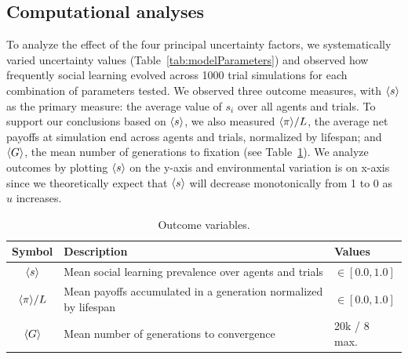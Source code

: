 \documentclass[letterpaper,11.5pt]{scrartcl}
\begin{document}
\subsection{Computational analyses}
\label{ssec:computationalAnalyses}


To analyze the effect of the four principal uncertainty factors, we systematically
varied uncertainty values (Table~\ref{tab:modelParameters}) and observed how frequently social learning evolved across
1000 trial simulations for each combination of parameters tested. %
We observed three outcome measures, with $\langle s \rangle$ as the primary measure: the average value of $s_i$ over all agents and trials. To support our conclusions
based on $\langle s \rangle$, we also measured $\langle \pi \rangle / L$, the average net  payoffs at simulation end across agents and trials, normalized by lifespan; 
and $\langle G \rangle$, the mean
number of generations to fixation (see Table~\ref{tab:outcomeVariables}). We analyze outcomes by plotting $\langle s \rangle$ on the y-axis and environmental variation is on x-axis since we
theoretically expect that $\langle s \rangle$ will decrease monotonically from 1 to 0 as $u$
increases. %

\begin{table}[h]
    \caption{Outcome variables.}
    \label{tab:outcomeVariables}
    \centering %
    \begin{tabular}{cp{4.25in}p{0.85in}} \toprule

        Symbol & Description & Values \\ 

        \midrule  

        $\langle s \rangle$ & Mean social learning prevalence over agents and trials
                  & $\in [0.0, 1.0]$ \\

        $\langle \pi \rangle / L$ & Mean payoffs accumulated in a generation normalized by
        lifespan & $\in [0.0, 1.0]$ \\

        $\langle G \rangle$ & Mean number of generations to convergence & 20k / 8 max. \\
        \bottomrule
    \end{tabular}
\end{table}
\end{document}
